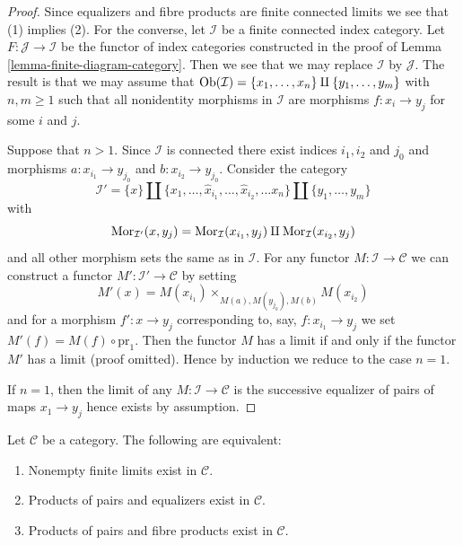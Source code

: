 \begin{proof}
Since equalizers and fibre products are finite connected
limits we see that (1) implies (2). For the converse, let $\mathcal{I}$
be a finite connected index category. Let
$F : \mathcal{J} \to \mathcal{I}$
be the functor of index categories constructed in the proof of
Lemma \ref{lemma-finite-diagram-category}.
Then we see that we may replace $\mathcal{I}$ by $\mathcal{J}$.
The result is that we may assume that
$\mathop{\mathrm{Ob}}\nolimits(\mathcal{I}) = \{x_1, \ldots, x_n\} \amalg \{y_1, \ldots, y_m\}$
with $n, m \geq 1$ such that all nonidentity morphisms in $\mathcal{I}$
are morphisms $f : x_i \to y_j$ for some $i$ and $j$.

\medskip\noindent
Suppose that $n > 1$. Since $\mathcal{I}$ is connected there
exist indices $i_1, i_2$ and $j_0$ and morphisms $a : x_{i_1} \to y_{j_0}$
and $b : x_{i_2} \to y_{j_0}$. Consider the category
$$
\mathcal{I}' =
\{x\} \amalg \{x_1, \ldots, \hat x_{i_1}, \ldots, \hat x_{i_2}, \ldots x_n\}
\amalg \{y_1, \ldots, y_m\}
$$
with
$$
\mathop{\mathrm{Mor}}\nolimits_{\mathcal{I}'}(x, y_j) = \mathop{\mathrm{Mor}}\nolimits_\mathcal{I}(x_{i_1}, y_j)
\amalg \mathop{\mathrm{Mor}}\nolimits_\mathcal{I}(x_{i_2}, y_j)
$$
and all other morphism sets the same as in $\mathcal{I}$. For any functor
$M : \mathcal{I} \to \mathcal{C}$ we can construct a functor
$M' : \mathcal{I}' \to \mathcal{C}$ by setting
$$
M'(x) = M(x_{i_1}) \times_{M(a), M(y_{j_0}), M(b)} M(x_{i_2})
$$
and for a morphism $f' : x \to y_j$ corresponding to, say,
$f : x_{i_1} \to y_j$ we set $M'(f) = M(f) \circ \text{pr}_1$.
Then the functor $M$ has a limit if and only if the functor $M'$ has
a limit (proof omitted). Hence by induction we reduce to the case $n = 1$.

\medskip\noindent
If $n = 1$, then the limit of any $M : \mathcal{I} \to \mathcal{C}$ is
the successive equalizer of pairs of maps $x_1 \to y_j$ hence
exists by assumption.
\end{proof}

\begin{lemma}
\label{lemma-almost-finite-limits-exist}
Let $\mathcal{C}$ be a category.
The following are equivalent:
\begin{enumerate}
\item Nonempty finite limits exist in $\mathcal{C}$.
\item Products of pairs and equalizers exist in $\mathcal{C}$.
\item Products of pairs and fibre products exist in $\mathcal{C}$.
\end{enumerate}
\end{lemma}

